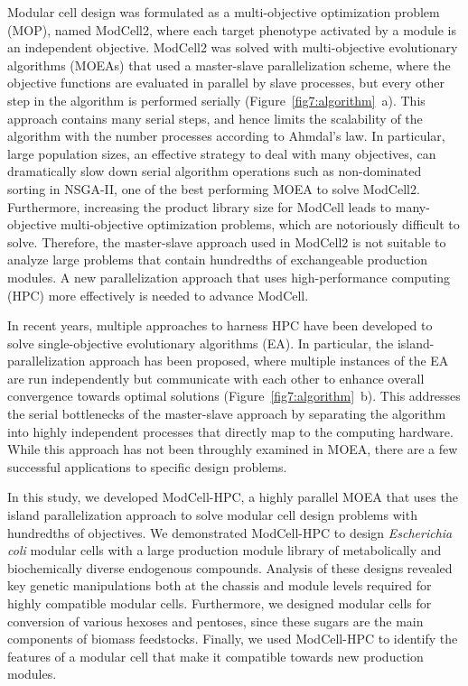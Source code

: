 Modular cell design was formulated as a multi-objective optimization problem (MOP), named ModCell2, where each target phenotype activated by a module is an independent objective.\citep{garcia2019}
ModCell2 was solved with multi-objective evolutionary algorithms (MOEAs) that used a master-slave parallelization scheme, where the objective functions are evaluated in parallel by slave processes, but every other step in the algorithm is performed serially (Figure~\ref{fig7:algorithm}~a).\citep{garcia2019, garcia2019c}
This approach contains many serial steps, and hence limits the scalability of the algorithm with the number processes according to Ahmdal's law.\citep{hill2008}
In particular, large population sizes, an effective strategy to deal with many objectives,\citep{garcia2019c,ishibuchi2009} can dramatically slow down serial algorithm operations such as non-dominated sorting in NSGA-II, \citep{deb2002} one of the best performing MOEA to solve ModCell2.\citep{garcia2019c}
Furthermore, increasing the product library size for ModCell leads to many-objective multi-objective optimization problems, which are notoriously difficult to solve.\citep{ishibuchi2008, li2018}
Therefore, the master-slave approach used in ModCell2 is not suitable to analyze large problems that contain hundredths of exchangeable production modules.
A new parallelization approach that uses high-performance computing (HPC) more effectively is needed to advance ModCell.

In recent years, multiple approaches to harness HPC have been developed to solve single-objective evolutionary algorithms (EA).\citep{alba2013}
In particular, the island-parallelization approach has been proposed, where multiple instances of the EA are run independently but communicate with each other to enhance overall convergence towards optimal solutions (Figure~\ref{fig7:algorithm}~b).
This addresses the serial bottlenecks of the master-slave approach by separating the algorithm into highly independent processes that directly map to the computing hardware.
While this approach has not been throughly examined in MOEA, there are a few successful applications to specific design problems.\citep{martens2013, jozefowiez2005, garcia2016}

In this study, we developed ModCell-HPC, a highly parallel MOEA that uses the island parallelization approach to solve modular cell design problems with hundredths of objectives.
We demonstrated ModCell-HPC to design \textit{Escherichia coli} modular cells with a large production module library of metabolically and biochemically diverse endogenous compounds.
Analysis of these designs revealed key genetic manipulations both at the chassis and module levels required for highly compatible modular cells.
Furthermore, we designed modular cells for conversion of various hexoses and pentoses, since these sugars are the main components of biomass feedstocks.\citep{brodeur2011}
Finally, we used ModCell-HPC to identify the features of a modular cell that make it compatible towards new production modules. %

